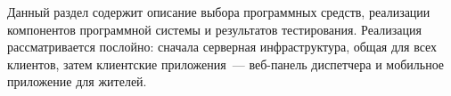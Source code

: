 Данный раздел содержит описание выбора программных средств, реализации компонентов программной системы и результатов тестирования. Реализация рассматривается послойно: сначала серверная инфраструктура, общая для всех клиентов, затем клиентские приложения~--- веб-панель диспетчера и мобильное приложение для жителей.





